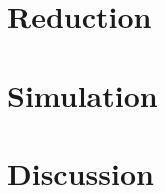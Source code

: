 \documentclass[12pt,english]{article}\usepackage[]{graphicx}\usepackage{xcolor}
\begin{document}
\section{Reduction}


\section{Simulation}


\section{Discussion}



\end{document}
